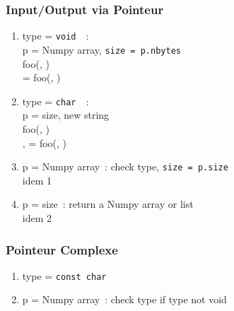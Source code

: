 \begin{frame}
  \frametitle{Input/Output via Pointeur}
  \begin{enumerate}
  \item type = \texttt{void \ptr}~: \\
    p = Numpy array, \texttt{size = p.nbytes} \\
     foo(, ) \\
     = foo(, ) \\[.5em]
  \item type = \texttt{char \ptr}~: \\
    p = size, new string \\
     foo(, ) \\
    ,  = foo(, ) \\[.5em]
  \item p = Numpy array~: check type, \texttt{size = p.size} \\
    idem 1 \\[.5em]
  \item p = size~: return a Numpy array or list \\
    idem 2
  \end{enumerate}
\end{frame}

\begin{frame}
  \frametitle{Pointeur Complexe}
  \begin{enumerate}
  \item type = \texttt{const char \ptr}
  \item p = Numpy array~: check type if type not void
  \end{enumerate}
\end{frame}

